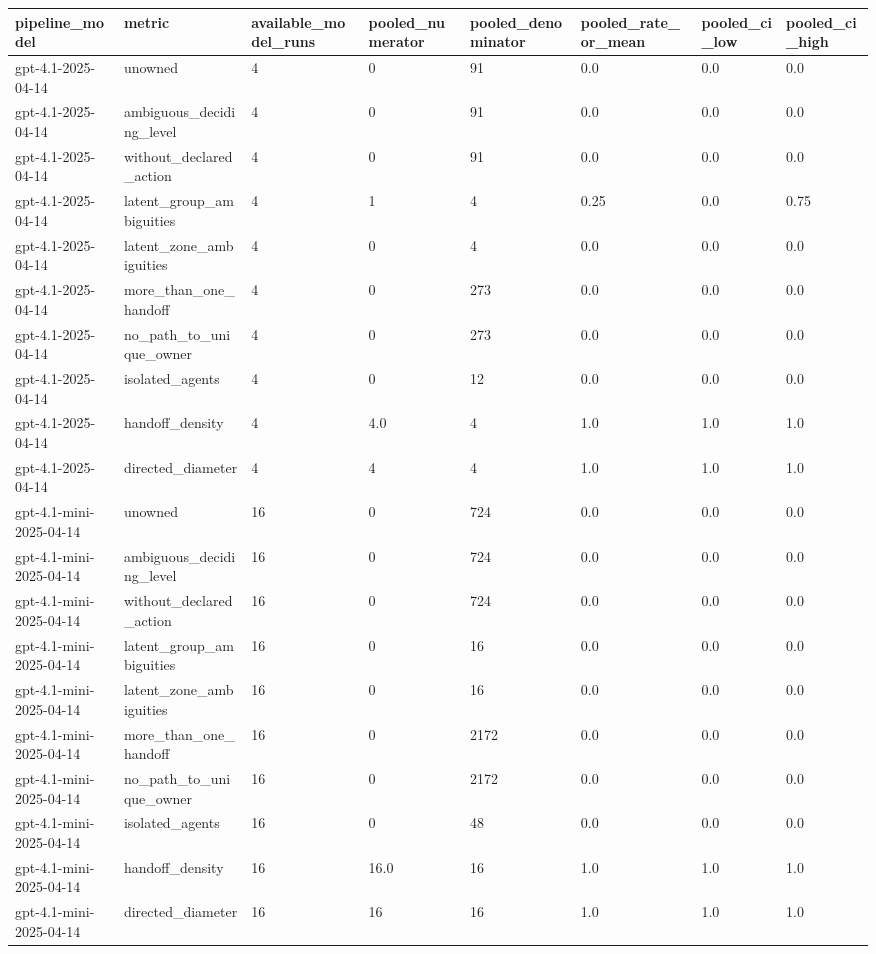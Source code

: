 \begin{tabular}{llllllll}
\toprule
pipeline\_model & metric & available\_model\_runs & pooled\_numerator & pooled\_denominator & pooled\_rate\_or\_mean & pooled\_ci\_low & pooled\_ci\_high \\
\midrule
gpt-4.1-2025-04-14 & unowned & 4 & 0 & 91 & 0.0 & 0.0 & 0.0 \\
gpt-4.1-2025-04-14 & ambiguous\_deciding\_level & 4 & 0 & 91 & 0.0 & 0.0 & 0.0 \\
gpt-4.1-2025-04-14 & without\_declared\_action & 4 & 0 & 91 & 0.0 & 0.0 & 0.0 \\
gpt-4.1-2025-04-14 & latent\_group\_ambiguities & 4 & 1 & 4 & 0.25 & 0.0 & 0.75 \\
gpt-4.1-2025-04-14 & latent\_zone\_ambiguities & 4 & 0 & 4 & 0.0 & 0.0 & 0.0 \\
gpt-4.1-2025-04-14 & more\_than\_one\_handoff & 4 & 0 & 273 & 0.0 & 0.0 & 0.0 \\
gpt-4.1-2025-04-14 & no\_path\_to\_unique\_owner & 4 & 0 & 273 & 0.0 & 0.0 & 0.0 \\
gpt-4.1-2025-04-14 & isolated\_agents & 4 & 0 & 12 & 0.0 & 0.0 & 0.0 \\
gpt-4.1-2025-04-14 & handoff\_density & 4 & 4.0 & 4 & 1.0 & 1.0 & 1.0 \\
gpt-4.1-2025-04-14 & directed\_diameter & 4 & 4 & 4 & 1.0 & 1.0 & 1.0 \\
gpt-4.1-mini-2025-04-14 & unowned & 16 & 0 & 724 & 0.0 & 0.0 & 0.0 \\
gpt-4.1-mini-2025-04-14 & ambiguous\_deciding\_level & 16 & 0 & 724 & 0.0 & 0.0 & 0.0 \\
gpt-4.1-mini-2025-04-14 & without\_declared\_action & 16 & 0 & 724 & 0.0 & 0.0 & 0.0 \\
gpt-4.1-mini-2025-04-14 & latent\_group\_ambiguities & 16 & 0 & 16 & 0.0 & 0.0 & 0.0 \\
gpt-4.1-mini-2025-04-14 & latent\_zone\_ambiguities & 16 & 0 & 16 & 0.0 & 0.0 & 0.0 \\
gpt-4.1-mini-2025-04-14 & more\_than\_one\_handoff & 16 & 0 & 2172 & 0.0 & 0.0 & 0.0 \\
gpt-4.1-mini-2025-04-14 & no\_path\_to\_unique\_owner & 16 & 0 & 2172 & 0.0 & 0.0 & 0.0 \\
gpt-4.1-mini-2025-04-14 & isolated\_agents & 16 & 0 & 48 & 0.0 & 0.0 & 0.0 \\
gpt-4.1-mini-2025-04-14 & handoff\_density & 16 & 16.0 & 16 & 1.0 & 1.0 & 1.0 \\
gpt-4.1-mini-2025-04-14 & directed\_diameter & 16 & 16 & 16 & 1.0 & 1.0 & 1.0 \\
\bottomrule
\end{tabular}
